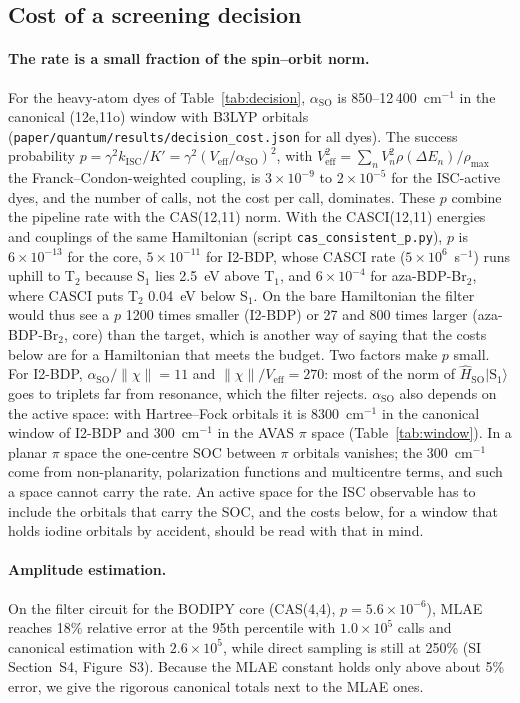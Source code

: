 \documentclass[journal=jctcce,manuscript=article]{achemso}
\newcommand{\kisc}{k_\mathrm{ISC}}
\newcommand{\Hso}{\hat H_\mathrm{SO}}
\newcommand{\aso}{\alpha_\mathrm{SO}}
\begin{document}
\subsection{Cost of a screening decision}
\label{sec:decision}

\paragraph{The rate is a small fraction of the spin--orbit norm.} For the heavy-atom dyes of Table~\ref{tab:decision}, $\aso$ is
850--12\,400~cm$^{-1}$ in the canonical (12e,11o) window with B3LYP orbitals (\texttt{paper/quantum/results/decision\_cost.json} for all dyes). The
success probability $p=\gamma^2\kisc/K'=\gamma^2(V_\mathrm{eff}/\aso)^2$, with
$V_\mathrm{eff}^2=\sum_nV_n^2\rho(\Delta E_n)/\rho_\mathrm{max}$ the Franck--Condon-weighted coupling, is
$3\times10^{-9}$ to $2\times10^{-5}$ for the ISC-active dyes, and the number of calls, not the cost per call,
dominates. These $p$ combine the pipeline rate with the CAS(12,11) norm. With the CASCI(12,11) energies and
couplings of the same Hamiltonian (script \texttt{cas\_consistent\_p.py}), $p$ is $6\times10^{-13}$ for the core,
$5\times10^{-11}$ for I2-BDP, whose CASCI rate ($5\times10^{6}$~s$^{-1}$) runs uphill to T$_2$ because S$_1$ lies
2.5~eV above T$_1$, and $6\times10^{-4}$ for aza-BDP-Br$_2$, where CASCI puts T$_2$ 0.04~eV below S$_1$. On the bare
Hamiltonian the filter would thus see a $p$ 1200 times smaller (I2-BDP) or 27 and 800 times larger (aza-BDP-Br$_2$, core) than the target, which is
another way of saying that the costs below are for a Hamiltonian that meets the budget. Two factors make $p$ small. For I2-BDP, $\aso/\lVert\chi\rVert=11$ and $\lVert\chi\rVert/V_\mathrm{eff}=270$:
most of the norm of $\Hso\lvert\mathrm{S}_1\rangle$ goes to triplets far from resonance, which the filter
rejects. $\aso$ also depends on the active space: with Hartree--Fock orbitals it is 8300~cm$^{-1}$ in the
canonical window of I2-BDP and 300~cm$^{-1}$ in the AVAS $\pi$ space (Table~\ref{tab:window}). In a planar
$\pi$ space the one-centre SOC between $\pi$ orbitals vanishes; the 300~cm$^{-1}$ come from non-planarity,
polarization functions and multicentre terms, and such a space cannot carry the rate. An active space for the
ISC observable has to include the orbitals that carry the SOC, and the costs below, for a window that holds
iodine orbitals by accident, should be read with that in mind.

\paragraph{Amplitude estimation.} On the filter circuit for the BODIPY core (CAS(4,4), $p=5.6\times10^{-6}$),
MLAE reaches 18\% relative error at the 95th percentile with $1.0\times10^{5}$ calls and canonical estimation with
$2.6\times10^{5}$, while direct sampling is still at 250\% (SI Section~S4, Figure~S3). Because the MLAE constant
holds only above about 5\% error, we give the rigorous canonical totals next to the MLAE ones.
\end{document}
